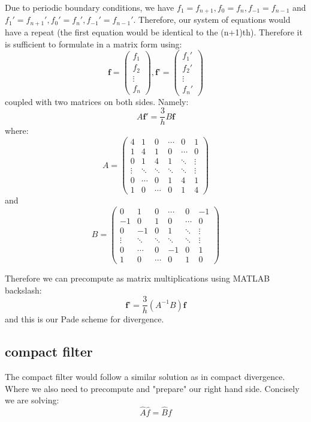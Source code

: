 \documentclass[12pt]{article}
\begin{document}
Due to periodic boundary conditions, we have $f_{1} = f_{n+1}, f_{0}=f_{n}, f_{-1}=f_{n-1}$ and $f_{1}' = f_{n+1}', f_{0}'=f_{n}', f_{-1}'=f_{n-1}'$. Therefore, our system of equations would have a repeat (the first equation would be identical to the (n+1)th). Therefore it is sufficient to formulate in a matrix form using:
$$
	\textbf{f} =
	\begin{pmatrix}
		f_1 \\
		f_2 \\
		\vdots \\
		f_{n}
	\end{pmatrix},
	\textbf{f'} =
	\begin{pmatrix}
		f_1' \\
		f_2' \\
		\vdots \\
		f_{n}'
	\end{pmatrix}
$$ coupled with two matrices on both sides. Namely:
$$
	A\mathbf{f'} = \frac{3}{h}B\mathbf{f}
$$ where:
$$
	A = 
	\begin{pmatrix}
		4 & 1 & 0 & \cdots & 0 & 1 \\
		1 & 4 & 1 & 0 & \cdots & 0 \\
		0 & 1 & 4 & 1 & \ddots & \vdots \\
		\vdots & \ddots & \ddots & \ddots & \ddots & \vdots \\
		0 & \cdots & 0 & 1 & 4 & 1 \\
		1 & 0 & \cdots & 0 & 1 & 4
	\end{pmatrix}
$$ and 
$$
	B = 
	\begin{pmatrix}
		0 & 1 & 0 & \cdots & 0 & -1 \\
		-1 & 0 & 1 & 0 & \cdots & 0 \\
		0 & -1 & 0 & 1 & \ddots & \vdots \\
		\vdots & \ddots & \ddots & \ddots & \ddots & \vdots \\
		0 & \cdots & 0 & -1 & 0 & 1 \\
		1 & 0 & \cdots & 0 & 1 & 0
	\end{pmatrix}
$$ 

Therefore we can precompute as matrix multiplications using MATLAB backslash:
$$
	\textbf{f'} = \frac{3}{h}(A^{-1}B)\textbf{f}
$$ and this is our Pade scheme for divergence.

\subsection{compact filter}
The compact filter would follow a similar solution as in compact divergence. Where we also need to precompute and "prepare" our right hand side. Concisely we are solving:
\begin{equation}
	\hat{A}\textbf{$\hat{f}$} = \hat{B}\textbf{$f$}
\end{equation}
\end{document}

